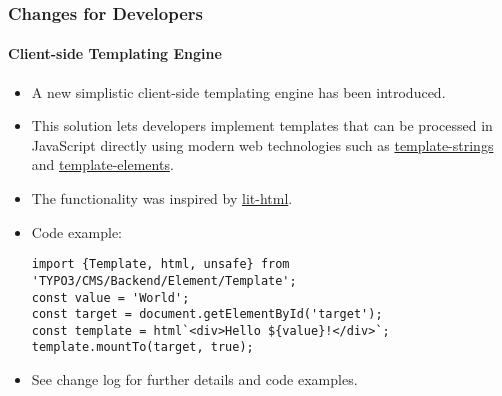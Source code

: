 %

\begin{frame}[fragile]
	\frametitle{Changes for Developers}
	\framesubtitle{Client-side Templating Engine}

	\lstset{basicstyle=\tiny\ttfamily}

	\begin{itemize}
		\item A new simplistic client-side templating engine has been introduced.
		\item This solution lets developers implement templates that can be processed
			in JavaScript directly using modern web technologies such as
			\href{https://developer.mozilla.org/en-US/docs/Web/JavaScript/Reference/Template\_literals}{template-strings}
			and
			\href{https://developer.mozilla.org/en-US/docs/Web/HTML/Element/template}{template-elements}.
		\item The functionality was inspired by \href{https://lit-html.polymer-project.org/}{lit-html}.
		\item Code example:
\begin{lstlisting}
import {Template, html, unsafe} from 'TYPO3/CMS/Backend/Element/Template';
const value = 'World';
const target = document.getElementById('target');
const template = html`<div>Hello ${value}!</div>`;
template.mountTo(target, true);
\end{lstlisting}
		\item See change log for further details and code examples.

	\end{itemize}
\end{frame}

